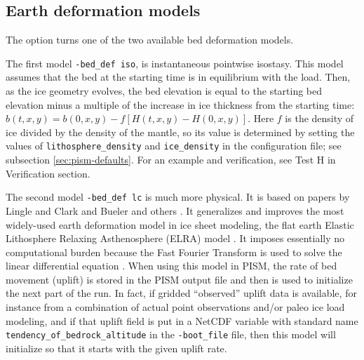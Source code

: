 

\subsection{Earth deformation models} \label{subsect:beddef}  

The option  turns one of the two available bed deformation models.

The first model \texttt{-bed_def iso}, is instantaneous pointwise isostasy.  This model assumes that the bed at the starting time is in equilibrium with the load.  Then, as the ice geometry evolves, the bed elevation is equal to the starting bed elevation minus a multiple of the increase in ice thickness from the starting time: $b(t,x,y) = b(0,x,y) - f [H(t,x,y) - H(0,x,y)]$.  Here $f$ is the density of ice divided by the density of the mantle, so its value is determined by setting the values of \texttt{lithosphere_density} and \texttt{ice_density} in the configuration file; see subsection \ref{sec:pism-defaults}.  For an example and verification, see Test H in Verification section. 

The second model \texttt{-bed_def lc} is much more physical.  It is based on papers by Lingle and Clark \cite{LingleClark} and Bueler and others \cite{BLKfastearth}.  It generalizes and improves the most widely-used earth deformation model in ice sheet modeling, the flat earth Elastic Lithosphere Relaxing Asthenosphere (ELRA) model \cite{Greve2001}.  It imposes  essentially no computational burden because the Fast Fourier Transform is used to solve the linear differential equation \cite{BLKfastearth}.  When using this model in PISM, the rate of bed movement (uplift) is stored in the PISM output file and then is used to initialize the next part of the run.  In fact, if gridded ``observed'' uplift data is available, for instance from a combination of actual point observations and/or paleo ice load modeling, and if that uplift field is put in a NetCDF variable with standard name \texttt{tendency_of_bedrock_altitude} in the  \texttt{-boot_file} file, then this model will initialize so that it starts with the given uplift rate.


